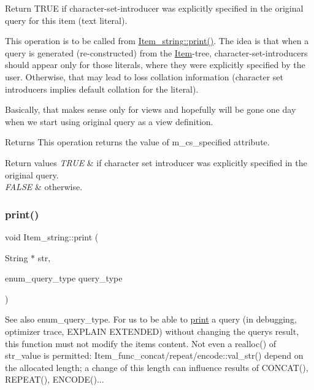 Return T\+R\+UE if character-\/set-\/introducer was explicitly specified in the original query for this item (text literal).

This operation is to be called from \mbox{\hyperlink{classItem__string_a4d6fccdca40394df6239ca7dfbb9bb09}{Item\+\_\+string\+::print()}}. The idea is that when a query is generated (re-\/constructed) from the \mbox{\hyperlink{classItem}{Item}}-\/tree, character-\/set-\/introducers should appear only for those literals, where they were explicitly specified by the user. Otherwise, that may lead to loss collation information (character set introducers implies default collation for the literal).

Basically, that makes sense only for views and hopefully will be gone one day when we start using original query as a view definition.

\begin{DoxyReturn}{Returns}
This operation returns the value of m\+\_\+cs\+\_\+specified attribute. 
\end{DoxyReturn}

\begin{DoxyRetVals}{Return values}
{\em T\+R\+UE} & if character set introducer was explicitly specified in the original query. \\
\hline
{\em F\+A\+L\+SE} & otherwise. \\
\hline
\end{DoxyRetVals}
\mbox{\label{classItem__string_a4d6fccdca40394df6239ca7dfbb9bb09}} 
\subsubsection{\texorpdfstring{print()}{print()}}
{\footnotesize\ttfamily void Item\+\_\+string\+::print (\begin{DoxyParamCaption}\item[{String $\ast$}]{str,  }\item[{enum\+\_\+query\+\_\+type}]{query\+\_\+type }\end{DoxyParamCaption})\hspace{0.3cm}{\ttfamily [virtual]}}

\begin{DoxySeeAlso}{See also}
enum\+\_\+query\+\_\+type. For us to be able to \mbox{\hyperlink{classItem__string_a4d6fccdca40394df6239ca7dfbb9bb09}{print}} a query (in debugging, optimizer trace, E\+X\+P\+L\+A\+IN E\+X\+T\+E\+N\+D\+ED) without changing the query\textquotesingle{}s result, this function must not modify the item\textquotesingle{}s content. Not even a realloc() of str\+\_\+value is permitted\+: Item\+\_\+func\+\_\+concat/repeat/encode\+::val\+\_\+str() depend on the allocated length; a change of this length can influence results of C\+O\+N\+C\+A\+T(), R\+E\+P\+E\+A\+T(), E\+N\+C\+O\+D\+E()... 
\end{DoxySeeAlso}


